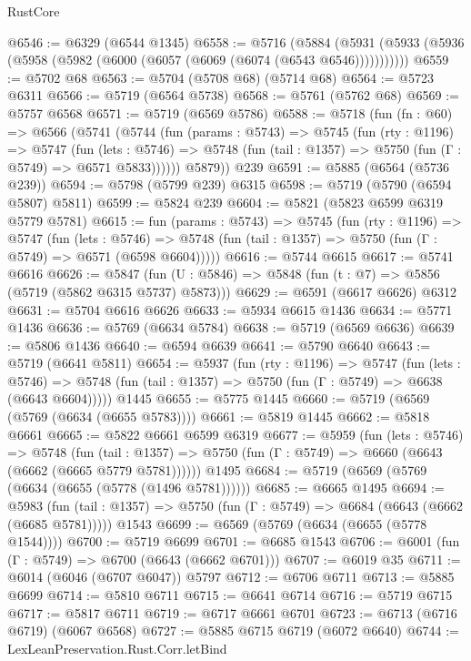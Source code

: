 \begin{lexlean}{RustCore}
\begin{coremodule}
{\begin{coremodule}
{{{{{{{{{{{{{{{{{{{{{{{{{{{{{{{{{{{{{{{{{{{{@6546 := @6329 (@6544 @1345)
@6558 := @5716
    (@5884 (@5931 (@5933 (@5936 (@5958 (@5982 (@6000 (@6057 (@6069 (@6074 (@6543 @6546)))))))))))
@6559 := @5702 @68
@6563 := @5704 (@5708 @68) (@5714 @68)
@6564 := @5723 @6311
@6566 := @5719 (@6564 @5738)
@6568 := @5761 (@5762 @68)
@6569 := @5757 @6568
@6571 := @5719 (@6569 @5786)
@6588 := @5718
    (fun (fn : @60) =>
    @6566
      (@5741
        (@5744
          (fun (params : @5743) =>
          @5745
            (fun (rty : @1196) =>
            @5747
              (fun (lets : @5746) =>
              @5748 (fun (tail : @1357) => @5750 (fun (Γ : @5749) => @6571 @5833))))))
        @5879))
    @239
@6591 := @5885 (@6564 (@5736 @239))
@6594 := @5798 (@5799 @239) @6315
@6598 := @5719 (@5790 (@6594 @5807) @5811)
@6599 := @5824 @239
@6604 := @5821 (@5823 @6599 @6319 @5779 @5781)
@6615 := fun (params : @5743) =>
  @5745
    (fun (rty : @1196) =>
    @5747
      (fun (lets : @5746) =>
      @5748 (fun (tail : @1357) => @5750 (fun (Γ : @5749) => @6571 (@6598 @6604)))))
@6616 := @5744 @6615
@6617 := @5741 @6616
@6626 := @5847 (fun (U : @5846) => @5848 (fun (t : @7) => @5856 (@5719 (@5862 @6315 @5737) @5873)))
@6629 := @6591 (@6617 @6626) @6312
@6631 := @5704 @6616 @6626
@6633 := @5934 @6615 @1436
@6634 := @5771 @1436
@6636 := @5769 (@6634 @5784)
@6638 := @5719 (@6569 @6636)
@6639 := @5806 @1436
@6640 := @6594 @6639
@6641 := @5790 @6640
@6643 := @5719 (@6641 @5811)
@6654 := @5937
    (fun (rty : @1196) =>
    @5747
      (fun (lets : @5746) =>
      @5748 (fun (tail : @1357) => @5750 (fun (Γ : @5749) => @6638 (@6643 @6604)))))
    @1445
@6655 := @5775 @1445
@6660 := @5719 (@6569 (@5769 (@6634 (@6655 @5783))))
@6661 := @5819 @1445
@6662 := @5818 @6661
@6665 := @5822 @6661 @6599 @6319
@6677 := @5959
    (fun (lets : @5746) =>
    @5748
      (fun (tail : @1357) => @5750 (fun (Γ : @5749) => @6660 (@6643 (@6662 (@6665 @5779 @5781))))))
    @1495
@6684 := @5719 (@6569 (@5769 (@6634 (@6655 (@5778 (@1496 @5781))))))
@6685 := @6665 @1495
@6694 := @5983
    (fun (tail : @1357) => @5750 (fun (Γ : @5749) => @6684 (@6643 (@6662 (@6685 @5781)))))
    @1543
@6699 := @6569 (@5769 (@6634 (@6655 (@5778 @1544))))
@6700 := @5719 @6699
@6701 := @6685 @1543
@6706 := @6001 (fun (Γ : @5749) => @6700 (@6643 (@6662 @6701)))
@6707 := @6019 @35
@6711 := @6014 (@6046 (@6707 @6047)) @5797
@6712 := @6706 @6711
@6713 := @5885 @6699
@6714 := @5810 @6711
@6715 := @6641 @6714
@6716 := @5719 @6715
@6717 := @5817 @6711
@6719 := @6717 @6661 @6701
@6723 := @6713 (@6716 @6719) (@6067 @6568)
@6727 := @5885 @6715 @6719 (@6072 @6640)
@6744 := LexLeanPreservation.Rust.Corr.letBind
}}}}}}}}}}}}}}}}}}}}}}}}}}}}}}}}}}}}}}}}}}}}
\end{coremodule}}
\end{coremodule}
\end{lexlean}
